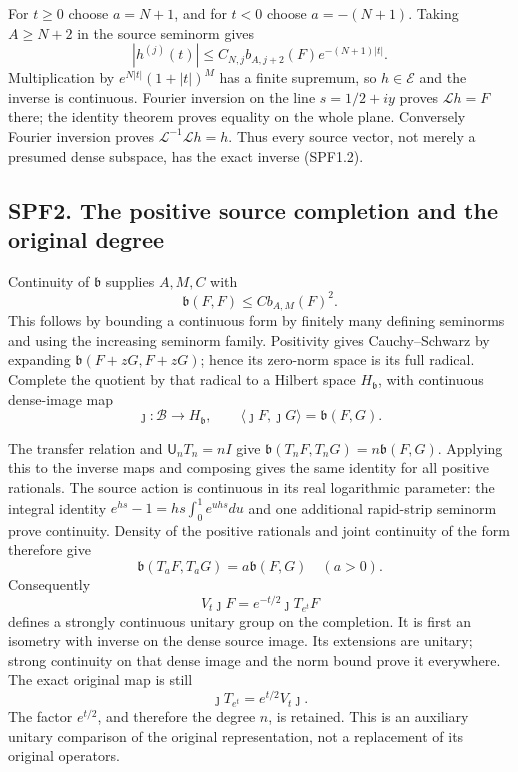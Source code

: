 For \(t\ge0\) choose \(a=N+1\), and for \(t<0\) choose \(a=-(N+1)\).
Taking \(A\ge N+2\) in the source seminorm gives \[
|h^{(j)}(t)|\le C_{N,j}b_{A,j+2}(F)e^{-(N+1)|t|}.
\tag{SPF1.4}
\] Multiplication by \(e^{N|t|}(1+|t|)^M\) has a finite supremum, so
\(h\in\mathcal E\) and the inverse is continuous. Fourier inversion on
the line \(s=1/2+iy\) proves \(\mathcal Lh=F\) there; the identity
theorem proves equality on the whole plane. Conversely Fourier inversion
proves \(\mathcal L^{-1}\mathcal Lh=h\). Thus every source vector, not
merely a presumed dense subspace, has the exact inverse (SPF1.2).

\subsection{SPF2. The positive source completion and the original
degree}\label{spf2.-the-positive-source-completion-and-the-original-degree}

Continuity of \(\mathfrak b\) supplies \(A,M,C\) with \[
\mathfrak b(F,F)\le C b_{A,M}(F)^2.
\tag{SPF2.1}
\] This follows by bounding a continuous form by finitely many defining
seminorms and using the increasing seminorm family. Positivity gives
Cauchy--Schwarz by expanding \(\mathfrak b(F+zG,F+zG)\); hence its
zero-norm space is its full radical. Complete the quotient by that
radical to a Hilbert space \(H_{\mathfrak b}\), with continuous
dense-image map \[
\jmath:\mathcal B\longrightarrow H_{\mathfrak b},
\qquad\langle\jmath F,\jmath G\rangle=\mathfrak b(F,G).
\tag{SPF2.2}
\]

The transfer relation and \(\mathsf U_nT_n=nI\) give
\(\mathfrak b(T_nF,T_nG)=n\mathfrak b(F,G)\). Applying this to the
inverse maps and composing gives the same identity for all positive
rationals. The source action is continuous in its real logarithmic
parameter: the integral identity \(e^{hs}-1=hs\int_0^1e^{uhs}du\) and
one additional rapid-strip seminorm prove continuity. Density of the
positive rationals and joint continuity of the form therefore give \[
\mathfrak b(T_aF,T_aG)=a\mathfrak b(F,G)
\quad(a>0).
\tag{SPF2.3}
\] Consequently \[
V_t\jmath F=e^{-t/2}\jmath T_{e^t}F
\tag{SPF2.4}
\] defines a strongly continuous unitary group on the completion. It is
first an isometry with inverse on the dense source image. Its extensions
are unitary; strong continuity on that dense image and the norm bound
prove it everywhere. The exact original map is still \[
\boxed{\jmath T_{e^t}=e^{t/2}V_t\jmath.}
\tag{SPF2.5}
\] The factor \(e^{t/2}\), and therefore the degree \(n\), is retained.
This is an auxiliary unitary comparison of the original representation,
not a replacement of its original operators.

